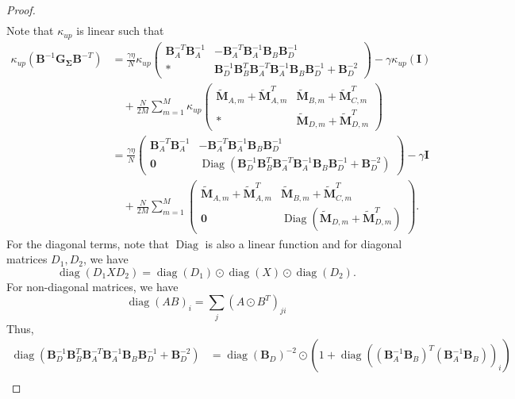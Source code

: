 \documentclass[a4paper, 11pt, oneside]{scrartcl}
\theoremstyle{break}
\DeclareMathOperator{\diag}{diag}
\DeclareMathOperator{\Diag}{Diag}
\newcommand{\matr}[1]{\boldsymbol{#1}}
\numberwithin{equation}{section}
\begin{document}
\begin{proof}
\begin{align*}
					\end{align*}
					Note that $\kappa_{up}$ is linear such that
					\begin{align*}
						\kappa_{up}(\matr{B}^{-1} \matr{G_{\Sigma}} \matr{B}^{-T}) &= \frac{\gamma \eta}{N} \kappa_{up} \begin{pmatrix} \matr{B}_A^{-T} \matr{B}_A^{-1} & -\matr{B}_A^{-T} \matr{B}_A^{-1} \matr{B}_B \matr{B}_D^{-1} \\ * & \matr{B}_D^{-1} \matr{B}_B^T \matr{B}_A^{-T} \matr{B}_A^{-1} \matr{B}_B \matr{B}_D^{-1} + \matr{B}_D^{-2} \end{pmatrix} - \gamma \kappa_{up}(\matr{I}) \\
						&\quad + \frac{N}{2 M} \sum_{m=1}^M \kappa_{up} \begin{pmatrix} \matr{\tilde{M}}_{A, m} + \matr{\tilde{M}}_{A, m}^T & \matr{\tilde{M}}_{B, m} + \matr{\tilde{M}}_{C, m}^T \\ * & \matr{\tilde{M}}_{D, m} + \matr{\tilde{M}}_{D, m}^T \end{pmatrix} \\
						&= \frac{\gamma \eta}{N} \begin{pmatrix} \matr{B}_A^{-T} \matr{B}_A^{-1} & -\matr{B}_A^{-T} \matr{B}_A^{-1} \matr{B}_B \matr{B}_D^{-1} \\ \matr{0} & \Diag(\matr{B}_D^{-1} \matr{B}_B^T \matr{B}_A^{-T} \matr{B}_A^{-1} \matr{B}_B \matr{B}_D^{-1} + \matr{B}_D^{-2}) \end{pmatrix} - \gamma \matr{I} \\
						&\quad + \frac{N}{2 M} \sum_{m=1}^M \begin{pmatrix} \matr{\tilde{M}}_{A, m} + \matr{\tilde{M}}_{A, m}^T & \matr{\tilde{M}}_{B, m} + \matr{\tilde{M}}_{C, m}^T \\ \matr{0} & \Diag(\matr{\tilde{M}}_{D, m} + \matr{\tilde{M}}_{D, m}^T) \end{pmatrix}.
					\end{align*}
					For the diagonal terms, note that $\Diag$ is also a linear function and for diagonal matrices $D_1, D_2$, we have
					$$\diag(D_1 X D_2) = \diag(D_1) \odot \diag(X) \odot \diag(D_2).$$
					For non-diagonal matrices, we have
					$$\diag(A B)_i = \sum_j (A \odot B^T)_{ji}$$
					Thus,
					\begin{align*}
						\diag(\matr{B}_D^{-1} \matr{B}_B^T \matr{B}_A^{-T} \matr{B}_A^{-1} \matr{B}_B \matr{B}_D^{-1} + \matr{B}_D^{-2}) &= \diag(\matr{B}_D)^{-2} \odot (1 + \diag((\matr{B}_A^{-1} \matr{B}_B)^T (\matr{B}_A^{-1} \matr{B}_B))_i) \\

\end{align*}
\end{proof}
\end{document}
